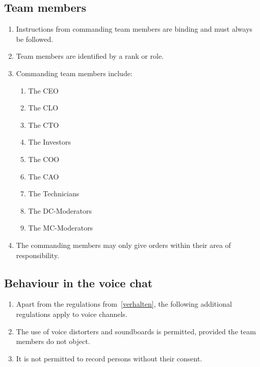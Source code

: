 \documentclass{article}
\begin{document}
\subsection{Team members}\label{members}
\begin{enumerate}[(1)]
	\item Instructions from commanding team members are binding and must always be followed.
	\item Team members are identified by a rank or role.
	\item Commanding team members include:
	\begin{enumerate}
		\item The CEO
		\item The CLO
		\item The CTO
		\item The Investors
		\item The COO
		\item The CAO
		\item The Technicians
		\item The DC-Moderators
		\item The MC-Moderators
	\end{enumerate}
	\item The commanding members may only give orders within their area of responsibility.
\end{enumerate}

\subsection{Behaviour in the voice chat}
\begin{enumerate}[(1)]
    \item Apart from the regulations from~\ref{verhalten}, the following additional regulations apply to voice channels.
	\item The use of voice distorters and soundboards is permitted, provided the team members do not object.
	\item It is not permitted to record persons without their consent.
\end{enumerate}
\end{document}
